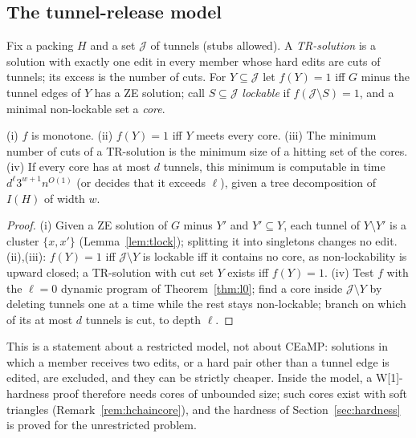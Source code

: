 \subsection{The tunnel-release model}
Fix a packing $H$ and a set $\mathcal J$ of tunnels (stubs allowed). A \emph{TR-solution} is a solution with exactly one edit in every member whose hard edits are cuts of tunnels; its excess is the number of cuts. For $Y\subseteq\mathcal J$ let $f(Y)=1$ iff $G$ minus the tunnel edges of $Y$ has a ZE solution; call $S\subseteq\mathcal J$ \emph{lockable} if $f(\mathcal J\setminus S)=1$, and a minimal non-lockable set a \emph{core}.
\begin{proposition}\label{prop:tTR}
(i) $f$ is monotone. (ii) $f(Y)=1$ iff $Y$ meets every core. (iii) The minimum number of cuts of a TR-solution is the minimum size of a hitting set of the cores. (iv) If every core has at most $d$ tunnels, this minimum is computable in time $d^{\ell}3^{w+1}n^{O(1)}$ (or decides that it exceeds $\ell$), given a tree decomposition of $I(H)$ of width $w$.
\end{proposition}
\begin{proof}
(i) Given a ZE solution of $G$ minus $Y'$ and $Y'\subseteq Y$, each tunnel of $Y\setminus Y'$ is a cluster $\{x,x'\}$ (Lemma~\ref{lem:tlock}); splitting it into singletons changes no edit. (ii),(iii): $f(Y)=1$ iff $\mathcal J\setminus Y$ is lockable iff it contains no core, as non-lockability is upward closed; a TR-solution with cut set $Y$ exists iff $f(Y)=1$. (iv) Test $f$ with the $\ell=0$ dynamic program of Theorem~\ref{thm:l0}; find a core inside $\mathcal J\setminus Y$ by deleting tunnels one at a time while the rest stays non-lockable; branch on which of its at most $d$ tunnels is cut, to depth $\ell$.
\end{proof}
This is a statement about a restricted model, not about CEaMP: solutions in which a member receives two edits, or a hard pair other than a tunnel edge is edited, are excluded, and they can be strictly cheaper. Inside the model, a W[1]-hardness proof therefore needs cores of unbounded size; such cores exist with soft triangles (Remark~\ref{rem:hchaincore}), and the hardness of Section~\ref{sec:hardness} is proved for the unrestricted problem.


